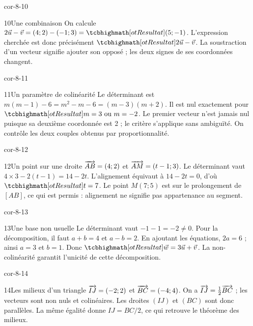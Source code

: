 \begin{blocLivre}{cor-8-10}
\begin{corrige}{10}{Une combinaison}
On calcule $2\vec u-\vec v=(4;2)-(-1;3)=\res{(5;-1)}$. L’expression cherchée est donc précisément $\res{2\vec u-\vec v}$. La soustraction d’un vecteur signifie ajouter son opposé ; les deux signes de ses coordonnées changent.
\label{fig-cor-8-10}
\end{corrige}
\end{blocLivre}
\begin{blocLivre}{cor-8-11}
\begin{corrige}{11}{Un paramètre de colinéarité}
Le déterminant est $m(m-1)-6=m^2-m-6=(m-3)(m+2)$. Il est nul exactement pour $\res{m=3\text{ ou }m=-2}$. Le premier vecteur n’est jamais nul puisque sa deuxième coordonnée est 2 ; le critère s’applique sans ambiguïté. On contrôle les deux couples obtenus par proportionnalité.
\label{fig-cor-8-11}
\end{corrige}
\end{blocLivre}
\begin{blocLivre}{cor-8-12}
\begin{corrige}{12}{Un point sur une droite}
$\overrightarrow{AB}=(4;2)$ et $\overrightarrow{AM}=(t-1;3)$. Le déterminant vaut $4\times3-2(t-1)=14-2t$. L’alignement équivaut à $14-2t=0$, d’où $\res{t=7}$. Le point $M(7;5)$ est sur le prolongement de $[AB]$, ce qui est permis : alignement ne signifie pas appartenance au segment.
\label{fig-cor-8-12}
\end{corrige}
\end{blocLivre}
\begin{blocLivre}{cor-8-13}
\begin{corrige}{13}{Une base non usuelle}
Le déterminant vaut $-1-1=-2\ne0$. Pour la décomposition, il faut $a+b=4$ et $a-b=2$. En ajoutant les équations, $2a=6$ ; ainsi $a=3$ et $b=1$. Donc $\res{\vec w=3\vec u+\vec v}$. La non-colinéarité garantit l’unicité de cette décomposition.
\label{fig-cor-8-13}
\end{corrige}
\end{blocLivre}
\begin{blocLivre}{cor-8-14}
\begin{corrige}{14}{Les milieux d’un triangle}
$\overrightarrow{IJ}=(-2;2)$ et $\overrightarrow{BC}=(-4;4)$. On a $\overrightarrow{IJ}=\tfrac12\overrightarrow{BC}$ ; les vecteurs sont non nuls et colinéaires. Les droites $(IJ)$ et $(BC)$ sont donc parallèles. La même égalité donne $IJ=BC/2$, ce qui retrouve le théorème des milieux.
\label{fig-cor-8-14}
\end{corrige}
\end{blocLivre}
